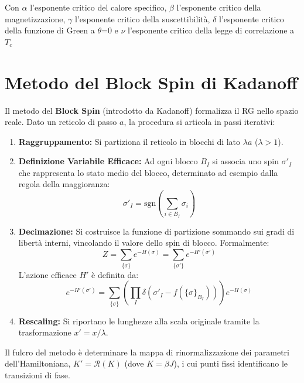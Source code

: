 Con $\alpha$ l'esponente critico del calore specifico, $\beta$ l'esponente critico della magnetizzazione, $\gamma$ l'esponente critico della suscettibilità, $\delta$ l'esponente critico della funzione di Green a $\theta$=0 e $\nu$ l'esponente critico della legge di correlazione a $T_c$

\section{Metodo del Block Spin di Kadanoff}
\label{sec:blockspin}

Il metodo del \textbf{Block Spin} (introdotto da Kadanoff) formalizza il RG nello spazio reale. Dato un reticolo di passo $a$, la procedura si articola in passi iterativi:
\begin{enumerate}
    \item \textbf{Raggruppamento:} Si partiziona il reticolo in blocchi di lato $\lambda a$ ($\lambda > 1$).
    \item \textbf{Definizione Variabile Efficace:} Ad ogni blocco $B_I$ si associa uno spin $\sigma'_I$ che rappresenta lo stato medio del blocco, determinato ad esempio dalla regola della maggioranza:
    \begin{equation}
        \sigma'_I = \text{sgn}\left(\sum_{i \in B_I} \sigma_i\right)
    \end{equation}
    \item \textbf{Decimazione:} Si costruisce la funzione di partizione sommando sui gradi di libertà interni, vincolando il valore dello spin di blocco. Formalmente:
    \begin{equation}
        Z = \sum_{\{\sigma\}} e^{-H(\sigma)} = \sum_{\{\sigma'\}} e^{-H'(\sigma')}
    \end{equation}
    L'azione efficace $H'$ è definita da:
    \begin{equation}
        e^{-H'(\sigma')} = \sum_{\{\sigma\}} \left( \prod_I \delta\left(\sigma'_I - f(\{\sigma\}_{B_I})\right) \right) e^{-H(\sigma)}
    \end{equation}
    \item \textbf{Rescaling:} Si riportano le lunghezze alla scala originale tramite la trasformazione $x' = x/\lambda$.
\end{enumerate}

Il fulcro del metodo è determinare la mappa di rinormalizzazione dei parametri dell'Hamiltoniana, $K' = \mathcal{R}(K)$ (dove $K = \beta J$), i cui punti fissi identificano le transizioni di fase.

